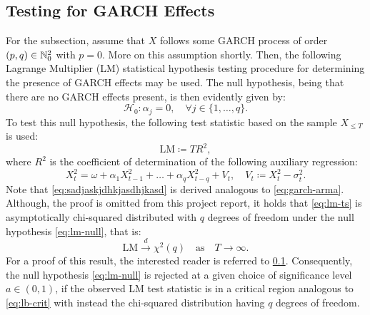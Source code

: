 \subsection{Testing for GARCH Effects}
For the subsection, assume that $X$ follows some GARCH process of order $(p,q)\in\mathbb{N}_{0}^{2}$ with $p=0$. More on this assumption shortly. Then, the following Lagrange Multiplier (LM) statistical hypothesis testing procedure for determining the presence of GARCH effects may be used. The null hypothesis, being that there are no GARCH effects present, is then evidently given by:
\begin{equation}\label{eq:lm-null}
    \mathcal{H}_{0}:\alpha_{j}=0,\quad\forall j\in\{1,\dots,q\}.
\end{equation}
To test this null hypothesis, the following test statistic based on the sample $X_{\leq T}$ is used:
\begin{equation}\label{eq:lm-ts}
    \mathrm{LM}\coloneqq T R^{2},
\end{equation}
where $R^{2}$ is the coefficient of determination of the following auxiliary regression:
\begin{equation}\label{eq:sadjaskjdhkjasdhjkasd}
    X_{t}^{2}=\omega+\alpha_{1}X_{t-1}^{2}+\dots+\alpha_{q}X_{t-q}^{2}+V_{t},\quad V_{t}\coloneqq X_{t}^{2}-\sigma_{t}^{2}.
\end{equation}
Note that \eqref{eq:sadjaskjdhkjasdhjkasd} is derived analogous to \eqref{eq:garch-arma}. Although, the proof is omitted from this project report, it holds that \eqref{eq:lm-ts} is asymptotically chi-squared distributed with $q$ degrees of freedom under the null hypothesis \eqref{eq:lm-null}, that is:
\begin{equation*}
    \mathrm{LM}\overset{d}{\to}\chi^{2}(q)\quad\textrm{as}\quad T\to\infty.
\end{equation*}
For a proof of this result, the interested reader is referred to \ref{}. %
Consequently, the null hypothesis \eqref{eq:lm-null} is rejected at a given choice of significance level $a\in(0,1)$, if the observed LM test statistic is in a critical region analogous to \eqref{eq:lb-crit} with instead the chi-squared distribution having $q$ degrees of freedom.

